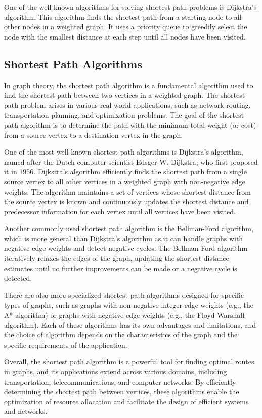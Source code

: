 \documentclass[12pt]{book} %
\begin{document}
One of the well-known algorithms for solving shortest path problems is Dijkstra's algorithm. This algorithm finds the shortest path from a starting node to all other nodes in a weighted graph. It uses a priority queue to greedily select the node with the smallest distance at each step until all nodes have been visited.

\subsection{Shortest Path Algorithms}
In graph theory, the shortest path algorithm is a fundamental algorithm used to find the shortest path between two vertices in a weighted graph. The shortest path problem arises in various real-world applications, such as network routing, transportation planning, and optimization problems. The goal of the shortest path algorithm is to determine the path with the minimum total weight (or cost) from a source vertex to a destination vertex in the graph.

One of the most well-known shortest path algorithms is Dijkstra's algorithm, named after the Dutch computer scientist Edsger W. Dijkstra, who first proposed it in 1956. Dijkstra's algorithm efficiently finds the shortest path from a single source vertex to all other vertices in a weighted graph with non-negative edge weights. The algorithm maintains a set of vertices whose shortest distance from the source vertex is known and continuously updates the shortest distance and predecessor information for each vertex until all vertices have been visited.

Another commonly used shortest path algorithm is the Bellman-Ford algorithm, which is more general than Dijkstra's algorithm as it can handle graphs with negative edge weights and detect negative cycles. The Bellman-Ford algorithm iteratively relaxes the edges of the graph, updating the shortest distance estimates until no further improvements can be made or a negative cycle is detected.

There are also more specialized shortest path algorithms designed for specific types of graphs, such as graphs with non-negative integer edge weights (e.g., the A* algorithm) or graphs with negative edge weights (e.g., the Floyd-Warshall algorithm). Each of these algorithms has its own advantages and limitations, and the choice of algorithm depends on the characteristics of the graph and the specific requirements of the application.

Overall, the shortest path algorithm is a powerful tool for finding optimal routes in graphs, and its applications extend across various domains, including transportation, telecommunications, and computer networks. By efficiently determining the shortest path between vertices, these algorithms enable the optimization of resource allocation and facilitate the design of efficient systems and networks.
\end{document}
